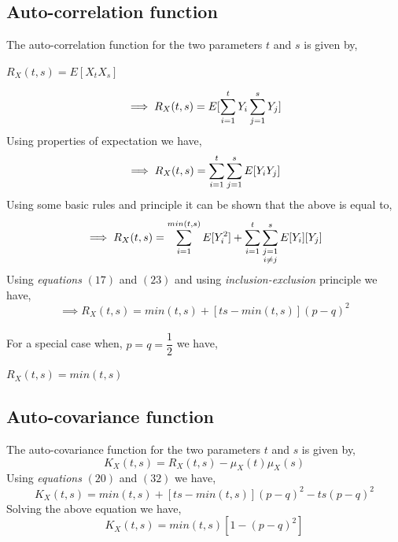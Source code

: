 \documentclass[12pt,a4paper]{article}%
\begin{document}
 	\subsection{Auto-correlation function}
 	The auto-correlation function for the two parameters $t$ and $s$ is given by,
 	\begin{center}
 		$R_{X}(t,s) = E[X_{t}X_{s}]$\\\smallskip
 	\end{center}
 	\begin{equation}
 		\implies R_{X}(t,s) = E[\sum_{\mathclap{i=1}}^{t} Y_{i} \sum_{\mathclap{j=1}}^{s} Y_{j}]
 	\end{equation}
 	Using properties of expectation we have,
 	\begin{equation}
 	\implies R_{X}(t,s) = \sum_{\mathclap{i=1}}^{t} \sum_{\mathclap{j=1}}^{s} E[Y_{i}  Y_{j}]
 	\end{equation}
 	Using some basic rules and principle it can be shown that the above is equal to,
 	\begin{equation}
 	\implies R_{X}(t,s) =\sum_{\mathclap{i=1}}^{min(t,s)} E[Y_{i}^{2}]  + \sum_{\mathclap{i=1}}^{t} \sum_{\substack{\mathclap{j=1}\\\mathclap{i\neq j}}}^{s} E[Y_{i}][ Y_{j}]
 	\end{equation}
 	Using \textit{equations} $(17)$ and $(23)$ and using \textit{inclusion-exclusion} principle we have,\\\smallskip
 	\begin{equation}
 	\implies \boxed{R_{X}(t,s) =min(t,s)  +[ts-min(t,s)](p-q)^{2}}
 	\end{equation}
 	\\\smallskip
 	For a special case when, $p=q=\dfrac{1}{2}$ we have,
 	\begin{center}
 		$R_{X}(t,s) =min(t,s)$
 	\end{center}
 	\pagebreak
 	\subsection{Auto-covariance function}
 	The auto-covariance function for the two parameters $t$ and $s$ is given by,
 	\begin{equation}
 		K_{X}(t,s) = R_{X}(t,s)-\mu_{X}(t)\mu_{X}(s)
 	\end{equation}
 	Using \textit{equations} $(20)$ and $(32)$ we have,
 	\begin{equation}
 		K_{X}(t,s) = min(t,s)  +[ts-min(t,s)](p-q)^{2}-ts(p-q)^{2}
 	\end{equation}
 	Solving the above equation we have,
 	\begin{equation}
 		\boxed{K_{X}(t,s) = min(t,s)[1-(p-q)^{2}]}
 	\end{equation}
\end{document}
